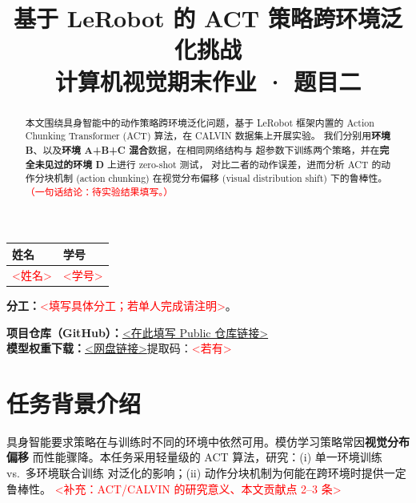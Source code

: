 \documentclass[11pt]{ctexart}
\title{\textbf{基于 LeRobot 的 ACT 策略跨环境泛化挑战}\\
\large 计算机视觉期末作业 · 题目二}
\author{}
\date{}
\begin{document}
\maketitle
\vspace{-2.5em}

\begin{center}
\begin{tabular}{ll}
\toprule
姓名 & 学号 \\
\midrule
\textcolor{red}{<姓名>} & \textcolor{red}{<学号>} \\
\bottomrule
\end{tabular}
\end{center}

\noindent\textbf{分工：}\textcolor{red}{<填写具体分工；若单人完成请注明>}。

\medskip
\noindent\textbf{项目仓库（GitHub）：}\url{<在此填写 Public 仓库链接>}\\
\noindent\textbf{模型权重下载：}\url{<网盘链接>}\quad 提取码：\textcolor{red}{<若有>}

\begin{abstract}
本文围绕具身智能中的动作策略跨环境泛化问题，基于 LeRobot 框架内置的
Action Chunking Transformer (ACT) 算法，在 CALVIN 数据集上开展实验。
我们分别用\textbf{环境 B}、以及\textbf{环境 A+B+C 混合}数据，在相同网络结构与
超参数下训练两个策略，并在\textbf{完全未见过的环境 D} 上进行 zero-shot 测试，
对比二者的动作误差，进而分析 ACT 的动作分块机制 (action chunking)
在视觉分布偏移 (visual distribution shift) 下的鲁棒性。
\textcolor{red}{（一句话结论：待实验结果填写。）}
\end{abstract}

\section{任务背景介绍}
具身智能要求策略在与训练时不同的环境中依然可用。模仿学习策略常因\textbf{视觉分布偏移}
而性能骤降。本任务采用轻量级的 ACT 算法，研究：(i) 单一环境训练 vs.\ 多环境联合训练
对泛化的影响；(ii) 动作分块机制为何能在跨环境时提供一定鲁棒性。
\textcolor{red}{<补充：ACT/CALVIN 的研究意义、本文贡献点 2--3 条>}

\end{document}
